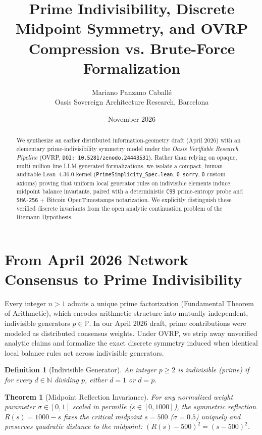 \documentclass[11pt,a4paper]{article}
\title{Prime Indivisibility, Discrete Midpoint Symmetry, and OVRP Compression vs. Brute-Force Formalization}
\author{Mariano Panzano Caball\'e \\ \small Oasis Sovereign Architecture Research, Barcelona}
\date{November 2026}
\newtheorem{definition}{Definition}
\newtheorem{theorem}{Theorem}
\begin{document}
\maketitle

\begin{abstract}
We synthesize an earlier distributed information-geometry draft (April 2026) with an elementary prime-indivisibility symmetry model under the \emph{Oasis Verifiable Research Pipeline} (OVRP, \texttt{DOI: 10.5281/zenodo.24443531}). Rather than relying on opaque, multi-million-line LLM-generated formalizations, we isolate a compact, human-auditable Lean~4.36.0 kernel (\texttt{PrimeSimplicity\_Spec.lean}, \texttt{0 sorry}, \texttt{0} custom axioms) proving that uniform local generator rules on indivisible elements induce midpoint balance invariants, paired with a deterministic \texttt{C99} prime-entropy probe and \texttt{SHA-256} + Bitcoin OpenTimestamps notarization. We explicitly distinguish these verified discrete invariants from the open analytic continuation problem of the Riemann Hypothesis.
\end{abstract}

\section{From April 2026 Network Consensus to Prime Indivisibility}
Every integer $n > 1$ admits a unique prime factorization (Fundamental Theorem of Arithmetic), which encodes arithmetic structure into mutually independent, indivisible generators $p \in \mathbb{P}$. In our April 2026 draft, prime contributions were modeled as distributed consensus weights. Under OVRP, we strip away unverified analytic claims and formalize the exact discrete symmetry induced when identical local balance rules act across indivisible generators.

\begin{definition}[Indivisible Generator]
An integer $p \ge 2$ is indivisible (prime) if for every $d \in \mathbb{N}$ dividing $p$, either $d = 1$ or $d = p$.
\end{definition}

\begin{theorem}[Midpoint Reflection Invariance]
For any normalized weight parameter $\sigma \in [0, 1]$ scaled in permille ($s \in [0, 1000]$), the symmetric reflection $R(s) = 1000 - s$ fixes the critical midpoint $s = 500$ ($\sigma = 0.5$) uniquely and preserves quadratic distance to the midpoint: $(R(s) - 500)^2 = (s - 500)^2$.
\end{theorem}
\end{document}
